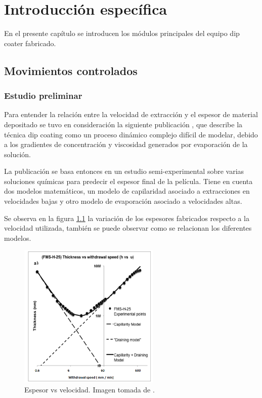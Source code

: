 
\chapter{Introducción específica} %

\label{Chapter2} %

En el presente capítulo se introducen los módulos principales del equipo dip coater fabricado.   

\section{Movimientos controlados}
\subsection{Estudio preliminar}

Para entender la relación entre la velocidad de extracción y el espesor de material depositado se tuvo en consideración la siguiente publicación \cite{paper_galo}, que describe la técnica dip coating como un proceso dinámico complejo difícil de modelar, debido a los gradientes de concentración y viscosidad generados por evaporación de la solución. 


La publicación se basa entonces en un estudio semi-experimental sobre varias soluciones químicas para predecir el espesor final de la película. Tiene en cuenta dos modelos matemáticos, un modelo de capilaridad asociado a extracciones en velocidades bajas y otro modelo de evaporación asociado a velocidades altas. 

Se observa en la figura \ref{fig:paper_galo} la variación de los espesores fabricados respecto a la velocidad utilizada, también se puede observar como se relacionan los diferentes modelos. 

\begin{figure}[ht]
\centering 
\includegraphics[width=0.6\textwidth]{./Figures/paper_galo.png}
\caption{Espesor vs velocidad. Imagen tomada de \cite{paper_galo}.}
\label{fig:paper_galo}
\end{figure}


